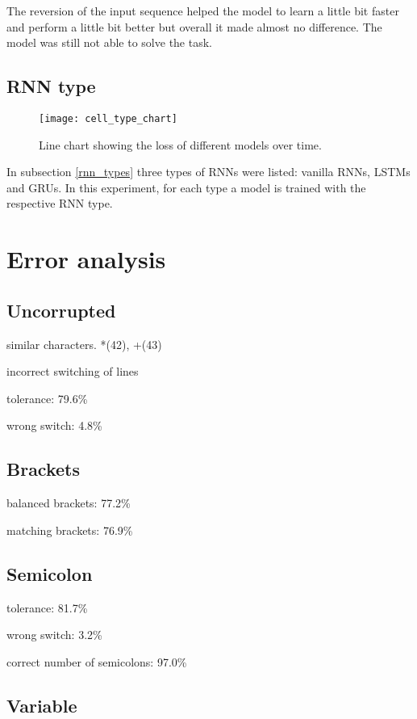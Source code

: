 The reversion of the input sequence helped the model to learn a little bit faster and perform a little bit better but overall it made almost no difference. The model was still not able to solve the task.

\subsection{RNN type}

\begin{figure}[p]
\centering
\texttt{[image: cell\_type\_chart]}
\caption{Line chart showing the loss of different models over time.}
\label{cell_type_chart}
\end{figure}

In subsection \ref{rnn_types} three types of RNNs were listed: vanilla RNNs, LSTMs and GRUs. In this experiment, for each type a model is trained with the respective RNN type.

\section{Error analysis}
\label{error_analysis}

\subsection{Uncorrupted}

similar characters. *(42), +(43)

incorrect switching of lines

tolerance: 79.6\%

wrong switch: 4.8\%

\subsection{Brackets}

balanced brackets: 77.2\%

matching brackets: 76.9\%

\subsection{Semicolon}

tolerance: 81.7\%

wrong switch: 3.2\%

correct number of semicolons: 97.0\%

\subsection{Variable}

